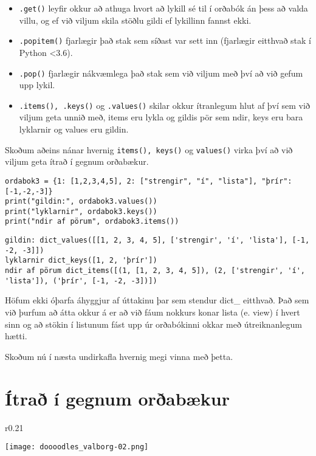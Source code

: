 \begin{itemize}
\item[] \texttt{.get()} leyfir okkur að athuga hvort að lykill sé til í orðabók án þess að valda villu, og ef við viljum skila stöðlu gildi ef lykillinn fannst ekki.
\item[] \texttt{.popitem()} fjarlægir það stak sem síðast var sett inn (fjarlægir eitthvað stak í Python <3.6).
\item[] \texttt{.pop()} fjarlægir nákvæmlega það stak sem við viljum með því að við gefum upp lykil.
\item[] \texttt{.items(), .keys()} og \texttt{.values()} skilar okkur ítranlegum hlut af því sem við viljum geta unnið með, items eru lykla og gildis pör sem ndir, keys eru bara lyklarnir og values eru gildin.
\end{itemize}

Skoðum aðeins nánar hvernig \texttt{items(), keys()} og \texttt{values()} virka því að við viljum geta ítrað í gegnum orðabækur.

\begin{lstlisting}[caption=Aðferðir á orðabækur, label=lst:dict-kynnt3]
ordabok3 = {1: [1,2,3,4,5], 2: ["strengir", "í", "lista"], "þrír": [-1,-2,-3]}
print("gildin:", ordabok3.values())
print("lyklarnir", ordabok3.keys())
print("ndir af pörum", ordabok3.items())
\end{lstlisting}
\lstset{style=uttak}
\begin{lstlisting}
gildin: dict_values([[1, 2, 3, 4, 5], ['strengir', 'í', 'lista'], [-1, -2, -3]])
lyklarnir dict_keys([1, 2, 'þrír'])
ndir af pörum dict_items([(1, [1, 2, 3, 4, 5]), (2, ['strengir', 'í', 'lista']), ('þrír', [-1, -2, -3])])
\end{lstlisting}
\lstset{style=venjulegt}

Höfum ekki óþarfa áhyggjur af úttakinu þar sem stendur dict\_ eitthvað.
Það sem við þurfum að átta okkur á er að við fáum nokkurs konar lista (e. view) í hvert sinn og að stökin í listunum fást upp úr orðabókinni okkar með útreiknanlegum hætti.

Skoðum nú í næsta undirkafla hvernig megi vinna með þetta.

\section{Ítrað í gegnum orðabækur}
 \begin{wrapfigure}{r}{0.21\textwidth} %
	\begin{center}
		\texttt{[image: doooodles\_valborg-02.png]}
	\end{center}
\end{wrapfigure}

